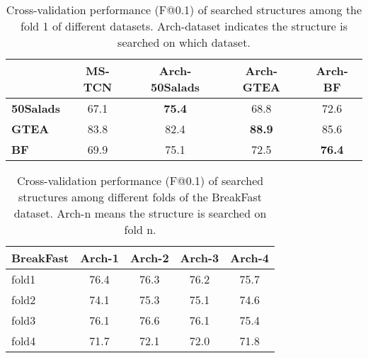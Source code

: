 \documentclass[final]{cvpr}
\newcommand{\tbf}[1]{\textbf{#1}}
\begin{document}
\begin{table}[t]
   \small
   \centering 
   \setlength{\tabcolsep}{1.0mm}
   \begin{tabular}{lcccc}  
   \toprule
   & MS-TCN  &\tbf{Arch-50Salads} & \tbf{Arch-GTEA} & \tbf{Arch-BF} \\
   \midrule
   \tbf{50Salads}
   &  67.1  & \tbf{75.4} & 68.8 & 72.6 \\
   \tbf{GTEA}
   & 83.8   & 82.4   & \tbf{88.9} & 85.6 \\
   \tbf{BF}
   & 69.9   & 75.1 & 72.5 & \tbf{76.4} \\
   \bottomrule
   \end{tabular}
   \vspace{2pt}
   \caption{Cross-validation performance (F@0.1) of searched structures among the fold 1 of different datasets. 
      Arch-dataset indicates the structure is searched on which dataset.} 
   \label{tab:ablation_cross_val_datasets}
\end{table}

\begin{table}[t]
   \small
   \centering 
   \setlength{\tabcolsep}{3.3mm}
   \begin{tabular}{lcccc}  \toprule
   \tbf{BreakFast} 
   & Arch-1 & Arch-2 & Arch-3 & Arch-4 \\
   \midrule
   fold1
   & 76.4 & 76.3 & 76.2 & 75.7  \\
   fold2
   & 74.1 & 75.3 & 75.1 & 74.6  \\
   fold3
   & 76.1 & 76.6 & 76.1 & 75.4  \\
   fold4
   & 71.7 & 72.1 & 72.0 & 71.8  \\
   \bottomrule
   \end{tabular}
   \vspace{2pt}
   \caption{Cross-validation performance (F@0.1) of searched structures among different folds of the BreakFast dataset. 
    Arch-n means the structure is searched on fold n.} 
   \label{tab:ablation_cross_val_splits}
\end{table}
\end{document}
